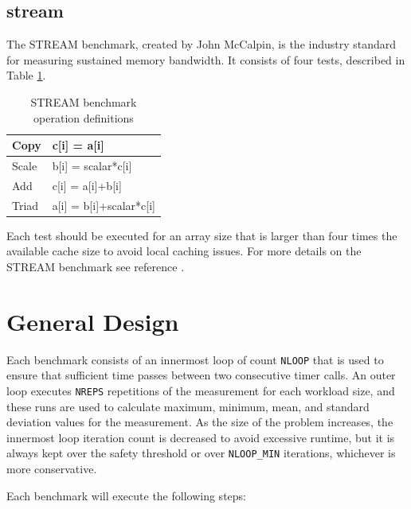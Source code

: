 \documentclass[10pt,a4paper]{report}
\begin{document}
\section*{stream}
The STREAM benchmark, created by John McCalpin, is the industry standard for measuring sustained memory bandwidth. It consists of four tests, described in Table \ref{tab:stream}.

\begin{table}[h!]
\centering
\caption{STREAM benchmark operation definitions}
\label{tab:stream}
\begin{tabular}{|l|l|}
\hline
Copy  & c[i] = a[i]\\\hline
Scale & b[i] = scalar*c[i]\\\hline
Add   & c[i] = a[i]+b[i]\\\hline
Triad & a[i] = b[i]+scalar*c[i]\\\hline
\end{tabular}
\end{table}

Each test should be executed for an array size that is larger than four times the available cache size to avoid local caching issues. For more details on the STREAM benchmark see reference \cite{stream}.

\FloatBarrier
\chapter{General Design}
Each benchmark consists of an innermost loop of count \verb+NLOOP+ that is used to ensure that sufficient time passes between two consecutive timer calls. An outer loop executes \verb+NREPS+ repetitions of the measurement for each workload size, and these runs are used to calculate maximum, minimum, mean, and standard deviation values for the measurement. As the size of the problem increases, the innermost loop iteration count is decreased to avoid excessive runtime, but it is always kept over the safety threshold or over \verb+NLOOP_MIN+ iterations, whichever is more conservative.

Each benchmark will execute the following steps:
\end{document}
